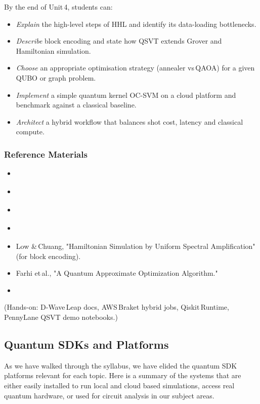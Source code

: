 By the end of Unit 4, students can:
\begin{itemize}
	\item \emph{Explain} the high-level steps of HHL and identify its data-loading bottlenecks.
	
	\item \emph{Describe} block encoding and state how QSVT extends Grover and Hamiltonian simulation.
	
	\item \emph{Choose} an appropriate optimisation strategy (annealer vs QAOA) for a given QUBO or graph problem.
	
	\item \emph{Implement} a simple quantum kernel OC-SVM on a cloud platform and benchmark against a classical baseline.
	
	\item \emph{Architect} a hybrid workflow that balances shot cost, latency and classical compute.
\end{itemize}

\subsubsection{Reference Materials}
\begin{itemize}
	\item \citeauthor{Lipton:2021} 
	\item \citeauthor{Harrow:2009} 
	\item \citeauthor{Abhijith:2022} 
	\item \citeauthor{Dalzell:2023} 
	\item Low \& Chuang, "Hamiltonian Simulation by Uniform Spectral Amplification" (for block encoding).
	\item Farhi et al., "A Quantum Approximate Optimization Algorithm."
	\item \citeauthor{Havlicek:2019} 
\end{itemize}

(Hands-on: D-Wave Leap docs, AWS Braket hybrid jobs, Qiskit Runtime, PennyLane QSVT demo notebooks.)

\subsection{Quantum SDKs and Platforms}

As we have walked through the syllabus, we have elided the quantum SDK platforms relevant for each topic.
Here is a summary of the systems that are either easily installed to run local and cloud based simulations, 
access real quantum hardware, or used for circuit analysis in our subject areas.

